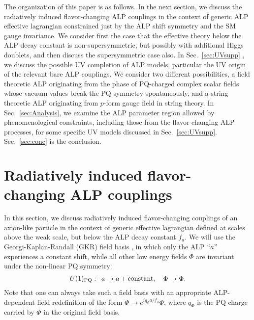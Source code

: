 \documentclass[preprint,prd,aps,tighten,nofootinbib,amssymb]{revtex4}
\newcommand{\bea}{\begin{eqnarray}}
\newcommand{\eea}{\end{eqnarray}}
\def\vpq{f_{a}}
\begin{document}
The organization of this paper is as follows. In the next section, we discuss the radiatively induced flavor-changing ALP couplings in the context of generic ALP effective lagrangian constrained just by the ALP shift symmetry and the SM gauge invariance. 
We consider first the case that the effective theory below the ALP decay constant  is non-supersymmetric, but possibly with additional Higgs doublets, and then discuss the supersymmetric case also.
In Sec.~\ref{sec:UVsupp} , we discuss the possible UV completion of  ALP models, particular the UV origin of the relevant bare ALP couplings.
We  consider two different possibilities, a field theoretic ALP   originating from the phase of PQ-charged complex scalar fields whose vacuum values break the PQ symmetry spontaneously, and a string theoretic  ALP originating from $p$-form gauge field in string theory. 
In Sec.~\ref{sec:Analysis}, we examine the ALP parameter region allowed by phenomenological constraints, including those from the flavor-changing ALP processes, for some specific UV models discussed in Sec.~\ref{sec:UVsupp}.   
Sec.~\ref{sec:conc} is the conclusion.

\section{Radiatively induced flavor-changing ALP couplings} \label{sec:EFT}

In this section, we discuss radiatively induced flavor-changing couplings of an axion-like particle in the context of generic effective lagrangian defined at scales above the weak scale, but below the ALP decay constant $f_a$. 
We will use the Georgi-Kaplan-Randall (GKR) field basis   \cite{Georgi:1986df,Choi:1986zw}, in which only the ALP $``a"$ experiences a constant shift, while all other low energy fields $\Phi$ are invariant under the non-linear PQ symmetry:
\bea
U(1)_{\rm PQ}:\,\,\, a\rightarrow a +{\rm constant}, \quad \Phi\rightarrow \Phi.
\eea 
Note that  one can always take such a field basis with an appropriate ALP-dependent field redefinition of the form $\Phi\rightarrow e^{iq_\Phi a/\vpq}\Phi$, where $q_\Phi$ is the PQ charge carried by $\Phi$ in the original field basis. 
\end{document}
